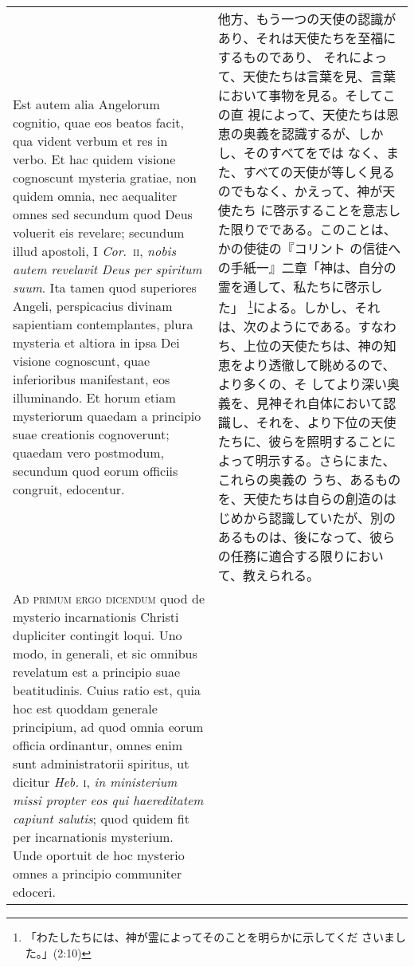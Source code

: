 \documentclass[10pt]{jsarticle} %
\begin{document}
\begin{longtable}{p{21em}p{21em}}
\\




Est autem alia Angelorum cognitio, quae eos beatos facit, qua vident
verbum et res in verbo. Et hac quidem visione cognoscunt mysteria
gratiae, non quidem omnia, nec aequaliter omnes sed secundum quod Deus
voluerit eis revelare; secundum illud apostoli, I {\itshape
Cor}.~{\scshape ii}, {\itshape nobis autem revelavit Deus per spiritum
suum}. Ita tamen quod superiores Angeli, perspicacius divinam
sapientiam contemplantes, plura mysteria et altiora in ipsa Dei
visione cognoscunt, quae inferioribus manifestant, eos illuminando. Et
horum etiam mysteriorum quaedam a principio suae creationis
cognoverunt; quaedam vero postmodum, secundum quod eorum officiis
congruit, edocentur.


&

他方、もう一つの天使の認識があり、それは天使たちを至福にするものであり、
それによって、天使たちは言葉を見、言葉において事物を見る。そしてこの直
視によって、天使たちは恩恵の奥義を認識するが、しかし、そのすべてをでは
なく、また、すべての天使が等しく見るのでもなく、かえって、神が天使たち
に啓示することを意志した限りでである。このことは、かの使徒の『コリント
の信徒への手紙一』二章「神は、自分の霊を通して、私たちに啓示した」
\footnote{「わたしたちには、神が霊によってそのことを明らかに示してくだ
さいました。」(2:10)}による。しかし、それは、次のようにである。すなわ
ち、上位の天使たちは、神の知恵をより透徹して眺めるので、より多くの、そ
してより深い奥義を、見神それ自体において認識し、それを、より下位の天使
たちに、彼らを照明することによって明示する。さらにまた、これらの奥義の
うち、あるものを、天使たちは自らの創造のはじめから認識していたが、別の
あるものは、後になって、彼らの任務に適合する限りにおいて、教えられる。


\\


{\scshape Ad primum ergo dicendum} quod de mysterio incarnationis
Christi dupliciter contingit loqui. Uno modo, in generali, et sic
omnibus revelatum est a principio suae beatitudinis. Cuius ratio est,
quia hoc est quoddam generale principium, ad quod omnia eorum officia
ordinantur, omnes enim sunt administratorii spiritus, ut dicitur
{\itshape Heb.} {\scshape i}, {\itshape in ministerium missi propter
eos qui haereditatem capiunt salutis}; quod quidem fit per
incarnationis mysterium. Unde oportuit de hoc mysterio omnes a
principio communiter edoceri.


&


\end{longtable}
\end{document}
